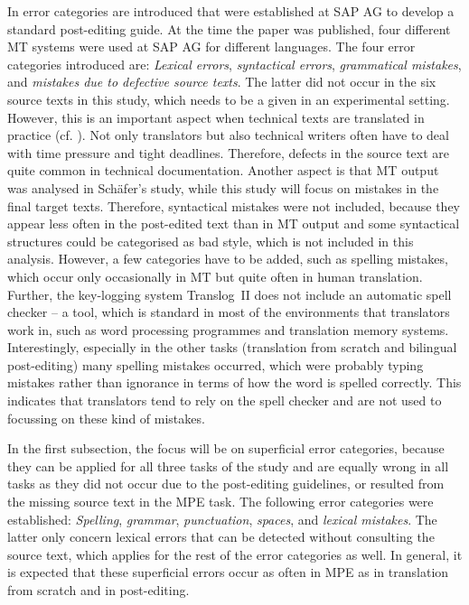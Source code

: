\documentclass[output=paper]{langsci/langscibook}
\begin{document}
In \citet{Schafer2003} error categories are introduced that were established at SAP AG to develop a standard post-editing guide. At the time the paper was published, four different MT systems were used at SAP AG for different languages. The four error categories introduced are: \textit{Lexical errors}, \textit{syntactical errors}, \textit{grammatical mistakes}, and \textit{mistakes due to defective source texts}. The latter did not occur in the six source texts in this study, which needs to be a given in an experimental setting. However, this is an important aspect when technical texts are translated in practice (cf. \citealt{hornhelf1999, hornhelf2007}). Not only translators but also technical writers often have to deal with time pressure and tight deadlines. Therefore, defects in the source text are quite common in technical documentation. Another aspect is that MT output was analysed in Schäfer's study, while this study will focus on mistakes in the final target texts. Therefore, syntactical mistakes were not included, because they appear less often in the post-edited text than in MT output and some syntactical structures could be categorised as bad style, which is not included in this analysis. However, a few categories have to be added, such as spelling mistakes, which occur only occasionally in MT but quite often in human translation. Further, the key-logging system Translog~II does not include an automatic spell checker -- a tool, which is standard in most of the environments that translators work in, such as word processing programmes and translation memory systems. Interestingly, especially in the other tasks (translation from scratch and bilingual post-editing) many spelling mistakes occurred, which were probably typing mistakes rather than ignorance in terms of how the word is spelled correctly. This indicates that translators tend to rely on the spell checker and are not used to focussing on these kind of mistakes.



In the first subsection, the focus will be on superficial error categories, because they can be applied for all three tasks of the study and are equally wrong in all tasks as they did not occur due to the post-editing guidelines, or resulted from the missing source text in the MPE task. The following error categories were established: \textit{Spelling},\textit{ grammar}, \textit{punctuation}, \textit{spaces}, and \textit{lexical mistakes}. The latter only concern lexical errors that can be detected without consulting the source text, which applies for the rest of the error categories as well. In general, it is expected that these superficial errors occur as often in MPE as in translation from scratch and in post-editing.
\end{document}
